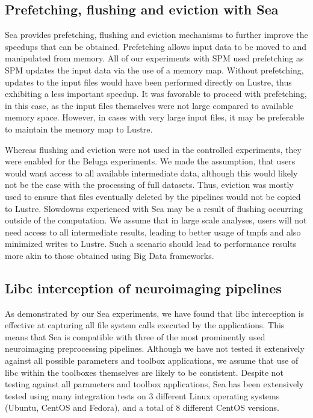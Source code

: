     \subsection{Prefetching, flushing and eviction with Sea}

    Sea provides prefetching, flushing and eviction mechanisms to further
    improve the speedups that can be obtained. Prefetching allows input
    data to be moved to and manipulated from memory. All of our experiments with
    SPM used prefetching as SPM updates the input data via the use of a memory
    map. Without prefetching, updates to the input files would have been
    performed directly on Lustre, thus exhibiting a less important speedup. It
    was favorable to proceed with prefetching, in this case, as the input files
    themselves were not large compared to available memory space. However, in
    cases with very large input files, it may be preferable to maintain the
    memory map to Lustre.

    Whereas flushing and eviction were not used in the controlled experiments,
    they were enabled for the Beluga experiments. We made the assumption, that 
    users would want access to all available intermediate data,
    although this would likely not be the case with the processing of full datasets.
    Thus, eviction was mostly used to ensure that files eventually deleted by
    the pipelines would not be copied to Lustre.
    Slowdowns experienced with Sea may be a result of flushing
    occurring outside of the computation. We assume that in large scale
    analyses, users will not need access to all intermediate results, leading to
    better usage of tmpfs and also minimized writes to Lustre. Such a scenario
    should lead to performance results more akin to those obtained using Big
    Data frameworks.

    \subsection{Libc interception of neuroimaging pipelines}
    
    As demonstrated by our Sea experiments, we have found that libc interception
    is effective at capturing all file system calls executed by the
    applications. This means that Sea is compatible with three of the most
    prominently used neuroimaging preprocessing pipelines. Although we have not
    tested it extensively against all possible parameters and toolbox
    applications, we assume that use of libc within the toolboxes themselves are
    likely to be consistent. Despite not testing against all parameters and
    toolbox applications, Sea has been extensively tested using many integration
    tests on 3 different Linux operating systems (Ubuntu, CentOS and Fedora),
    and a total of 8 different CentOS versions.

